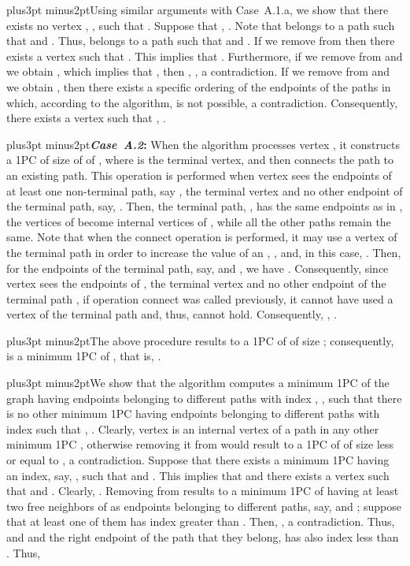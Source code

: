 \documentclass[10pt]{article}
\def\yskip{\penalty-50\vskip3pt plus3pt minus2pt}
\def\y{\yskip}
\begin{document}
{\y Using similar arguments with Case~A.1.a, we show that there
exists no vertex , , such that
. Suppose that
, .
Note that  belongs to a path  such that
 and . Thus,  belongs to a path
 such that  and
. If we remove  from
 then there exists a vertex
 such that
. This implies that
. Furthermore, if we remove  from
 and we obtain
, which implies that
, then , , a contradiction. If we remove  from
 and we obtain
, then there exists a
specific ordering of the endpoints of the paths in
 which, according to the
algorithm, is not possible, a contradiction. Consequently, there
exists a vertex  such that , .

\y {\bf \textit{Case~A.2}:} When the algorithm processes vertex
, it constructs a 1PC of size 
of  of , where
 is the terminal vertex, and then connects the path  to an existing path. This operation is performed when vertex
 sees the endpoints of at least one non-terminal path, say
, the terminal vertex  and no other
endpoint of the terminal path, say, .
Then, the terminal path, , has the same endpoints as in
, the vertices of  become
internal vertices of , while all the other paths remain the
same. Note that when the connect operation is performed, it may
use a vertex of the terminal path in order to increase the value
of an , , and, in this
case, . Then, for
the endpoints of the terminal path, say,  and
, we have . Consequently, since vertex 
sees the endpoints of , the terminal vertex  and no
other endpoint of the terminal path , if operation connect
was called previously, it cannot have used a vertex of the
terminal path and, thus,
 cannot hold.
Consequently, ,
.

\y The above procedure results to a 1PC of  of size
;
consequently,  is a minimum 1PC of
, that is, .

\y We show that the algorithm computes a minimum 1PC
 of the graph  having
 endpoints  belonging to different
paths with index , , such that
there is no other minimum 1PC 
having  endpoints  belonging to
different paths with index  such that
, .
Clearly, vertex  is an internal vertex of a path in any other
minimum 1PC , otherwise removing it
from  would result to a 1PC of
 of size less or equal to , a
contradiction. Suppose that there exists a minimum 1PC
 having an index, say, , such
that  and . This implies that
 and there exists a
vertex  such that  and
. Clearly,
. Removing  from
 results to a minimum 1PC of 
having at least two free neighbors of  as endpoints belonging
to different paths, say,  and ; suppose that at least
one of them has index greater than . Then,
, a
contradiction. Thus,  and  and the
right endpoint of the path that they belong, has also index less
than . Thus,

}
\end{document}
